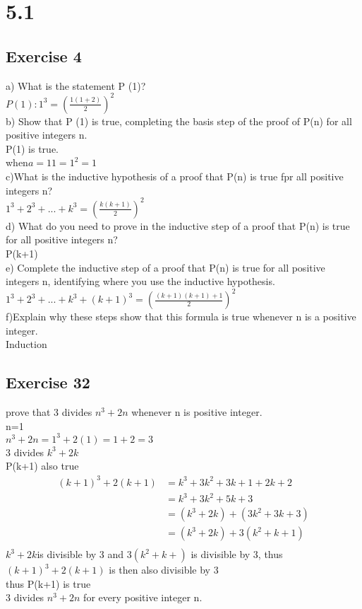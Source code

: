 \documentclass[12pt]{article}
\begin{document}
\section*{5.1}
\subsection*{Exercise 4}
a) What is the statement P (1)?\\
$P(1):1^3=(\frac{1(1+2)}{2})^2$\\

b) Show that P (1) is true, completing the basis step of the proof of P(n) for all positive integers n.\\
P(1) is true.\\
when$ a=1 1=1^2=1$\\

c)What is the inductive hypothesis of a proof that P(n) is true fpr all positive integers n?\\
$1^3+2^3+...+k^3=(\frac{k(k+1)}{2})^2$\\

d) What do you need to prove in the inductive step of a proof that P(n) is true for all positive integers n?\\
P(k+1)\\

e) Complete the inductive step of a proof that P(n) is true for all positive integers n, identifying where you use the inductive hypothesis.\\
$1^3+2^3+...+k^3+(k+1)^3=(\frac{(k+1)(k+1)+1}{2})^2$\\

f)Explain why these steps show that this formula is true whenever n is a positive integer.\\
Induction\\

\subsection*{Exercise 32}
prove that 3 divides $n^3 +2n$ whenever n is positive integer.\\
n=1\\
$n^3+2n=1^3+2(1)=1+2=3$\\
3 divides $k^3+2k$\\
P(k+1) also true\\
\begin{equation}\nonumber
    \begin{split}
       (k+1)^3+2(k+1)&=k^3+3k^2+3k+1+2k+2\\
       &=k^3+3k^2+5k+3\\
       &=(k^3+2k)+(3k^2+3k+3)\\
       &=(k^3+2k)+3(k^2+k+1)\\
    \end{split}
\end{equation}
$k^3+2k $is divisible by 3 and $3(k^2+k+)$ is divisible by 3, thus $(k+1)^3+2(k+1)$ is then also divisible by 3\\
thus P(k+1) is true\\
3 divides $n^3+2n$ for every positive integer n.\\
\end{document}
